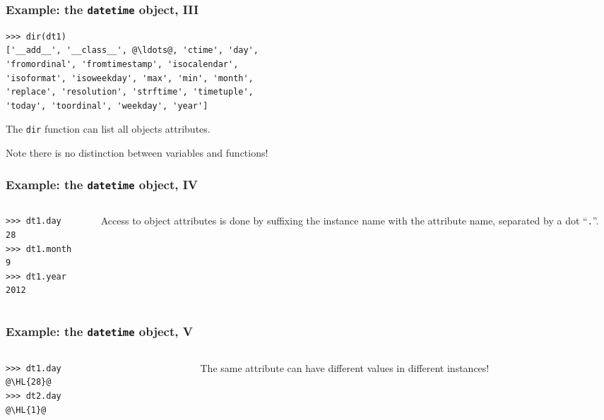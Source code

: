 \documentclass[english,serif,mathserif,xcolor=pdftex,dvipsnames,table]{beamer}
\begin{document}
\begin{frame}[fragile]
  \frametitle{Example: the \texttt{datetime} object, III}
\begin{lstlisting}
>>> dir(dt1)
['__add__', '__class__', @\ldots@, 'ctime', 'day', 
'fromordinal', 'fromtimestamp', 'isocalendar', 
'isoformat', 'isoweekday', 'max', 'min', 'month', 
'replace', 'resolution', 'strftime', 'timetuple', 
'today', 'toordinal', 'weekday', 'year']
\end{lstlisting}

  \+
  The \texttt{dir} function can list all objects attributes.

  \+
  Note there is no distinction between variables and functions!
\end{frame}


\begin{frame}[fragile]
  \frametitle{Example: the \texttt{datetime} object, IV}
  \begin{columns}[c]
    \begin{column}{0.5\textwidth}
\begin{lstlisting}
>>> dt1.day
28
>>> dt1.month
9
>>> dt1.year
2012
\end{lstlisting}
    \end{column}
    \begin{column}{0.5\textwidth}
      \raggedleft 
      Access to object attributes is done by suffixing the
      instance name with the attribute name, separated by a dot
      ``\texttt{.}''.
    \end{column}
  \end{columns}
\end{frame}


\begin{frame}[fragile]
  \frametitle{Example: the \texttt{datetime} object, V}
  \begin{columns}[c]
    \begin{column}{0.5\textwidth}
\begin{lstlisting}
>>> dt1.day
@\HL{28}@
>>> dt2.day
@\HL{1}@
\end{lstlisting}
    \end{column}
    \begin{column}{0.5\textwidth}
      \raggedleft 
      The same attribute can have different 
      values in different instances!
    \end{column}
  \end{columns}
\end{frame}
\end{document}
